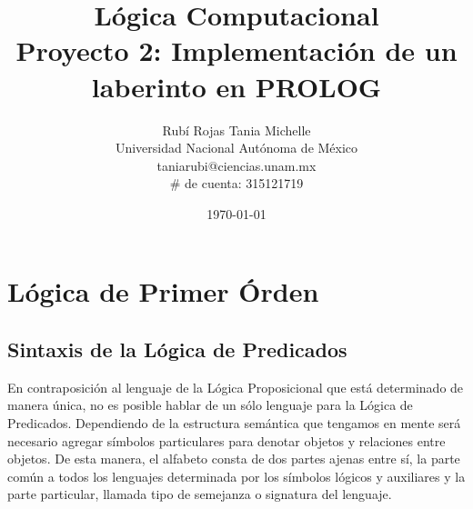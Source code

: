 \documentclass[letterpaper,12pt]{article}
\title{Lógica Computacional \\ 
Proyecto 2: Implementación de un laberinto en PROLOG}
\author{Rubí Rojas Tania Michelle \\
        Universidad Nacional Autónoma de México \\
        taniarubi@ciencias.unam.mx \\
        $\#$ de cuenta: 315121719}
\date{\today}
\begin{document}
    \maketitle
    \tableofcontents

    \newpage
    \section{Lógica de Primer Órden}
    \subsection{Sintaxis de la Lógica de Predicados}
    En contraposición al lenguaje de la Lógica Proposicional que está 
    determinado de manera única, no es posible hablar de un sólo lenguaje para
    la Lógica de Predicados. Dependiendo de la estructura semántica que tengamos
    en mente será necesario agregar símbolos particulares para denotar objetos
    y relaciones entre objetos. De esta manera, el alfabeto consta de dos partes  
    ajenas entre sí, la parte común a todos los lenguajes determinada por los 
    símbolos lógicos y auxiliares y la parte particular, llamada tipo de 
    semejanza o signatura del lenguaje.
\end{document}
